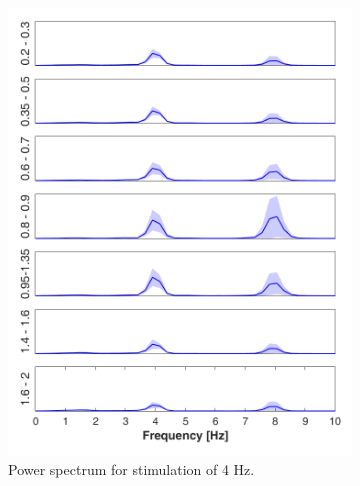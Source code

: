 \documentclass{pracalicmgr}
\begin{document}
\begin{figure}[H]\ContinuedFloat		
	
	\begin{subfigure}{.5\textwidth}
		\centering
		\includegraphics[width=1.\linewidth]{widmo_4Hz.png}
		\caption{Power spectrum for stimulation of 4 Hz.}
		\label{rys:widmo_4Hz}
	\end{subfigure}
	\begin{subfigure}{.5\textwidth}
		\centering

\end{subfigure}
\end{figure}
\end{document}
